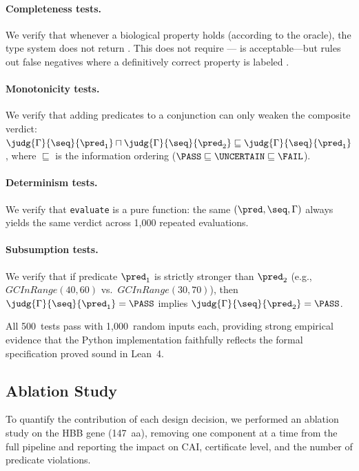 \paragraph{Completeness tests.}
We verify that whenever a biological property holds (according to the
oracle), the type system does not return \FAIL.  This does not require
\PASS---\UNCERTAIN{} is acceptable---but rules out false negatives
where a definitively correct property is labeled \FAIL.

\paragraph{Monotonicity tests.}
We verify that adding predicates to a conjunction can only weaken the
composite verdict: $\judg{\Gamma}{\seq}{\pred_1} \sqcap
\judg{\Gamma}{\seq}{\pred_2} \sqsubseteq
\judg{\Gamma}{\seq}{\pred_1}$, where $\sqsubseteq$ is the information
ordering ($\PASS \sqsubseteq \UNCERTAIN \sqsubseteq \FAIL$).

\paragraph{Determinism tests.}
We verify that \texttt{evaluate} is a pure function: the same
$(\pred, \seq, \Gamma)$ always yields the same verdict across 1,000
repeated evaluations.

\paragraph{Subsumption tests.}
We verify that if predicate $\pred_1$ is strictly stronger than
$\pred_2$ (e.g., $\mathit{GCInRange}(40, 60)$ vs.\
$\mathit{GCInRange}(30, 70)$), then $\judg{\Gamma}{\seq}{\pred_1} =
\PASS$ implies $\judg{\Gamma}{\seq}{\pred_2} = \PASS$.

All 500~tests pass with 1,000~random inputs each, providing strong
empirical evidence that the Python implementation faithfully reflects
the formal specification proved sound in Lean~4.

\subsection{Ablation Study}\label{sec:ablation}

To quantify the contribution of each design decision, we performed an
ablation study on the HBB gene (147~aa), removing one component at a
time from the full pipeline and reporting the impact on CAI, certificate
level, and the number of predicate violations.

